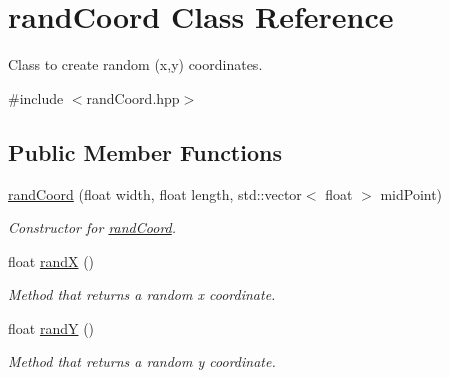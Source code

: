 \hypertarget{classrandCoord}{}\section{rand\+Coord Class Reference}
\label{classrandCoord}


Class to create random (x,y) coordinates.  




{\ttfamily \#include $<$rand\+Coord.\+hpp$>$}

\subsection*{Public Member Functions}
\begin{DoxyCompactItemize}
\item 
\hyperlink{classrandCoord_a4801fb81c057265e1e52c11a01742ed5}{rand\+Coord} (float width, float length, std\+::vector$<$ float $>$ mid\+Point)\hypertarget{classrandCoord_a4801fb81c057265e1e52c11a01742ed5}{}\label{classrandCoord_a4801fb81c057265e1e52c11a01742ed5}

\begin{DoxyCompactList}\small\item\em Constructor for \hyperlink{classrandCoord}{rand\+Coord}. \end{DoxyCompactList}\item 
float \hyperlink{classrandCoord_a65cc89b59cd5e404d27ec695c6ce5c26}{randX} ()
\begin{DoxyCompactList}\small\item\em Method that returns a random x coordinate. \end{DoxyCompactList}\item 
float \hyperlink{classrandCoord_a8a0542d795995dacaf15d9f86a6d7b88}{randY} ()
\begin{DoxyCompactList}\small\item\em Method that returns a random y coordinate. \end{DoxyCompactList}\end{DoxyCompactItemize}
